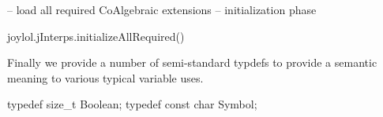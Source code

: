 -- load all required CoAlgebraic extensions -- initialization phase

joylol.jInterps.initializeAllRequired()

\stopLuaCode

Finally we provide a number of semi-standard typdefs to provide a semantic 
meaning to various typical variable uses. 

\startCHeader
typedef size_t     Boolean;
typedef const char Symbol;
\stopCHeader
